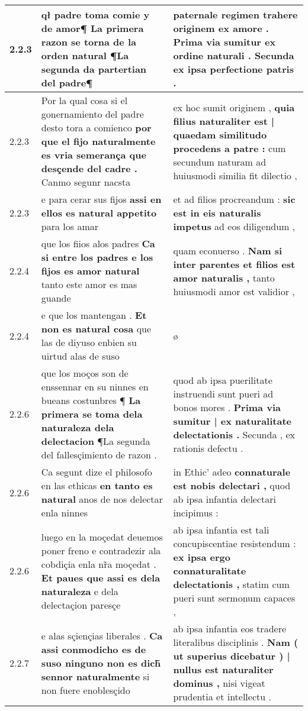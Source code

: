 \begin{tabular}{|p{1cm}|p{6.5cm}|p{6.5cm}|}
2.2.3 & qł padre toma comie y de amor¶ \textbf{ La primera razon se torna de la orden natural } ¶La segunda da partertian del padre¶ & paternale regimen trahere originem ex amore . \textbf{ Prima via sumitur ex ordine naturali . } Secunda ex ipsa perfectione patris . \\\hline
2.2.3 & Por la qual cosa si el gonernamiento del padre desto tora a comienco \textbf{ por que el fijo naturalmente es vria semerança que desçende del cadre . } Canmo segunr nacsta & ex hoc sumit originem , \textbf{ quia filius naturaliter est | quaedam similitudo procedens a patre : } cum secundum naturam ad huiusmodi similia fit dilectio , \\\hline
2.2.3 & e para cerar sus fijos \textbf{ assi en ellos es natural appetito } para los amar & et ad filios procreandum : \textbf{ sic est in eis naturalis impetus } ad eos diligendum , \\\hline
2.2.4 & que los fiios alos padres \textbf{ Ca si entre los padres e los fijos es amor natural } tanto este amor es mas guande & quam econuerso . \textbf{ Nam si inter parentes et filios est amor naturalis , } tanto huiusmodi amor est validior , \\\hline
2.2.4 & e que los mantengan . \textbf{ Et non es natural cosa } que las de diyuso enbien su uirtud alas de suso & ø \\\hline
2.2.6 & que los moços son de enssennar en su ninnes en bueans costunbres ¶ \textbf{ La primera se toma dela naturaleza dela delectacion } ¶La segunda del fallesçimiento de razon . & quod ab ipsa puerilitate instruendi sunt pueri ad bonos mores . \textbf{ Prima via sumitur | ex naturalitate delectationis . } Secunda , ex rationis defectu . \\\hline
2.2.6 & Ca segunt dize el philosofo en las ethicas \textbf{ en tanto es natural } anos de nos delectar enla ninnes & in Ethic’ adeo \textbf{ connaturale est nobis delectari , } quod ab ipsa infantia delectari incipimus : \\\hline
2.2.6 & luego en la moçedat deuemos poner freno e contradezir ala cobdiçia enla nr̃a moçedat . \textbf{ Et paues que assi es dela naturaleza } e dela delectaçion paresçe & ab ipsa infantia est tali concupiscentiae resistendum : \textbf{ ex ipsa ergo connaturalitate delectationis , } statim cum pueri sunt sermonum capaces , \\\hline
2.2.7 & e alas sçiençias liberales . \textbf{ Ca assi conmodicho es de suso ninguno non es dich̃ sennor naturalmente } si non fuere enoblesçido & ab ipsa infantia eos tradere literalibus disciplinis . \textbf{ Nam ( ut superius dicebatur ) | nullus est naturaliter dominus , } nisi vigeat prudentia et intellectu . \\\hline

\end{tabular}
